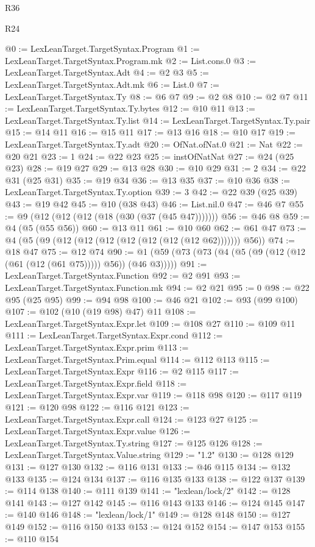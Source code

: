 \begin{lexlean}{R36}
\begin{lexlean}{R24}
\begin{coremodule}
{{{{{{{{{{{{{{{{{{{{{{{{{{{{{{{{{{{{{{{{{{{{{{{{{{{{{{{{{{{{{{{{{{{{{{{{{{{{{{{{{{{{{{{{{{{{{{{{{{{{{{{{{{{{{{{{{{{{{{{{{{{{{{{{{{{{{{{{{{{{{{{{{{{{{{{{{{{{{{{{{{{{{{{{{{{{{{{{{{{{{{{{{{{{{{{{{{{@0 := LexLeanTarget.TargetSyntax.Program
@1 := LexLeanTarget.TargetSyntax.Program.mk
@2 := List.cons.{0}
@3 := LexLeanTarget.TargetSyntax.Adt
@4 := @2 @3
@5 := LexLeanTarget.TargetSyntax.Adt.mk
@6 := List.{0}
@7 := LexLeanTarget.TargetSyntax.Ty
@8 := @6 @7
@9 := @2 @8
@10 := @2 @7
@11 := LexLeanTarget.TargetSyntax.Ty.bytes
@12 := @10 @11
@13 := LexLeanTarget.TargetSyntax.Ty.list
@14 := LexLeanTarget.TargetSyntax.Ty.pair
@15 := @14 @11
@16 := @15 @11
@17 := @13 @16
@18 := @10 @17
@19 := LexLeanTarget.TargetSyntax.Ty.adt
@20 := OfNat.ofNat.{0}
@21 := Nat
@22 := @20 @21
@23 := 1
@24 := @22 @23
@25 := instOfNatNat
@27 := @24 (@25 @23)
@28 := @19 @27
@29 := @13 @28
@30 := @10 @29
@31 := 2
@34 := @22 @31 (@25 @31)
@35 := @19 @34
@36 := @13 @35
@37 := @10 @36
@38 := LexLeanTarget.TargetSyntax.Ty.option
@39 := 3
@42 := @22 @39 (@25 @39)
@43 := @19 @42
@45 := @10 (@38 @43)
@46 := List.nil.{0}
@47 := @46 @7
@55 := @9 (@12 (@12 (@12 (@18 (@30 (@37 (@45 @47)))))))
@56 := @46 @8
@59 := @4 (@5 (@55 @56))
@60 := @13 @11
@61 := @10 @60
@62 := @61 @47
@73 := @4 (@5 (@9 (@12 (@12 (@12 (@12 (@12 (@12 (@12 @62))))))) @56))
@74 := @18 @47
@75 := @12 @74
@90 := @1 (@59 (@73 (@73 (@4 (@5 (@9 (@12 (@12 (@61 (@12 (@61 @75))))) @56)) (@46 @3)))))
@91 := LexLeanTarget.TargetSyntax.Function
@92 := @2 @91
@93 := LexLeanTarget.TargetSyntax.Function.mk
@94 := @2 @21
@95 := 0
@98 := @22 @95 (@25 @95)
@99 := @94 @98
@100 := @46 @21
@102 := @93 (@99 @100)
@107 := @102 (@10 (@19 @98) @47) @11
@108 := LexLeanTarget.TargetSyntax.Expr.let
@109 := @108 @27
@110 := @109 @11
@111 := LexLeanTarget.TargetSyntax.Expr.cond
@112 := LexLeanTarget.TargetSyntax.Expr.prim
@113 := LexLeanTarget.TargetSyntax.Prim.equal
@114 := @112 @113
@115 := LexLeanTarget.TargetSyntax.Expr
@116 := @2 @115
@117 := LexLeanTarget.TargetSyntax.Expr.field
@118 := LexLeanTarget.TargetSyntax.Expr.var
@119 := @118 @98
@120 := @117 @119
@121 := @120 @98
@122 := @116 @121
@123 := LexLeanTarget.TargetSyntax.Expr.call
@124 := @123 @27
@125 := LexLeanTarget.TargetSyntax.Expr.value
@126 := LexLeanTarget.TargetSyntax.Ty.string
@127 := @125 @126
@128 := LexLeanTarget.TargetSyntax.Value.string
@129 := "1.2"
@130 := @128 @129
@131 := @127 @130
@132 := @116 @131
@133 := @46 @115
@134 := @132 @133
@135 := @124 @134
@137 := @116 @135 @133
@138 := @122 @137
@139 := @114 @138
@140 := @111 @139
@141 := "lexlean/lock/2"
@142 := @128 @141
@143 := @127 @142
@145 := @116 @143 @133
@146 := @124 @145
@147 := @140 @146
@148 := "lexlean/lock/1"
@149 := @128 @148
@150 := @127 @149
@152 := @116 @150 @133
@153 := @124 @152
@154 := @147 @153
@155 := @110 @154
}}}}}}}}}}}}}}}}}}}}}}}}}}}}}}}}}}}}}}}}}}}}}}}}}}}}}}}}}}}}}}}}}}}}}}}}}}}}}}}}}}}}}}}}}}}}}}}}}}}}}}}}}}}}}}}}}}}}}}}}}}}}}}}}}}}}}}}}}}}}}}}}}}}}}}}}}}}}}}}}}}}}}}}}}}}}}}}}}}}}}}}}}}}}}}}}}}}
\end{coremodule}
\end{lexlean}
\end{lexlean}
